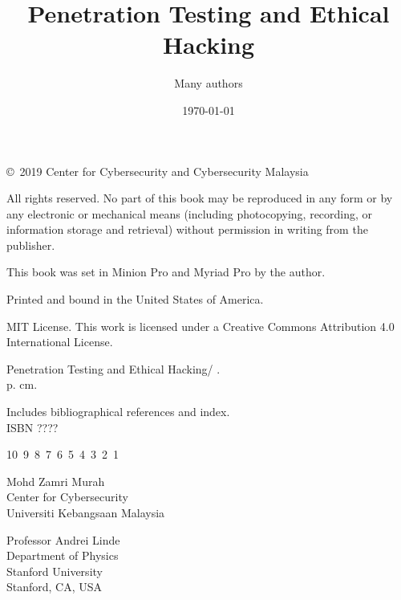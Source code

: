 \documentclass[7x9]{times}
\title{Penetration Testing and Ethical Hacking}
\author{Many authors}
\date{\today}
\begin{document}

\titlepage

\begin{copyrightpage}

  \copyright\ 2019 Center for Cybersecurity and Cybersecurity Malaysia
	
	All rights reserved. No part of this book may be reproduced in
        any form or by any electronic or mechanical means (including
        photocopying, recording, or information storage and retrieval)
        without permission in writing from the publisher.
	
	
	This book was set in Minion Pro and Myriad Pro by the author.
	
	Printed and bound in the United States of America.
	
	MIT License. This work is licensed under a Creative Commons Attribution 
	4.0 International License.
	
	Penetration Testing and Ethical Hacking/ .\\
	\hspace*{6pt} p. cm.
	
	Includes bibliographical references and index.\\ ISBN ????
        \vfill
	
	10\ 9\ 8\ 7\ 6\ 5\ 4\ 3\ 2\ 1\
	
\end{copyrightpage}

\tableofcontents
\listoffigures
\listoftables

\begin{contributors}[twocolumn]
	
	\contrib 
	Mohd Zamri Murah\\
	Center for Cybersecurity\\
	Universiti Kebangsaan Malaysia
	
	\contrib 
	Professor Andrei Linde\\
	Department of Physics\\
	Stanford University\\
	Stanford, CA, USA
\end{contributors}
\end{document}
